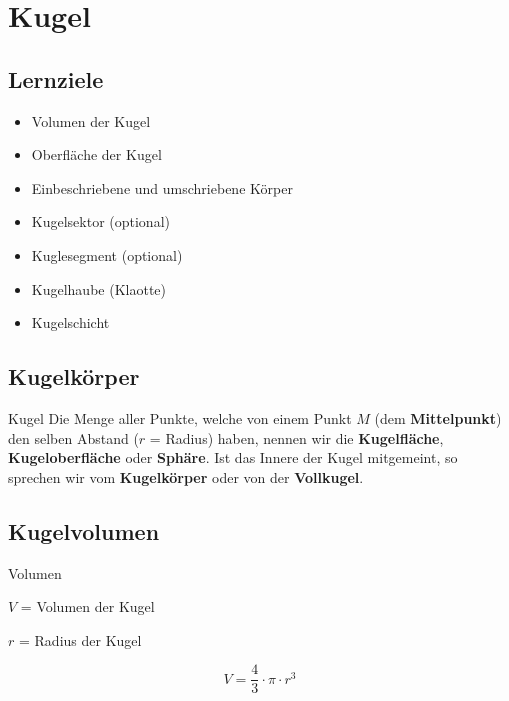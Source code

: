\section{Kugel}


\subsection*{Lernziele}
\begin{itemize}
\item Volumen der Kugel
\item Oberfläche der Kugel
\item Einbeschriebene und umschriebene Körper
\item Kugelsektor (optional)
\item Kuglesegment (optional)
\item Kugelhaube (Klaotte)
\item Kugelschicht
\end{itemize}
\newpage

\subsection{Kugelkörper}


\begin{definition}{Kugel}{}
  Die Menge aller Punkte, welche von einem Punkt $M$ (dem \textbf{Mittelpunkt}) den selben Abstand ($r$ = Radius) haben, nennen wir die \textbf{Kugelfläche}, \textbf{Kugeloberfläche} oder \textbf{Sphäre}.
  Ist das Innere der Kugel mitgemeint, so sprechen wir vom \textbf{Kugelkörper} oder von der \textbf{Vollkugel}.
\end{definition}
\newpage

\subsection{Kugelvolumen}


\begin{gesetz}{Volumen}{}

  $V$ = Volumen der Kugel

  $r$ = Radius der Kugel

  $$V = \frac43\cdot{}\pi\cdot{}r^3$$
  \end{gesetz}

